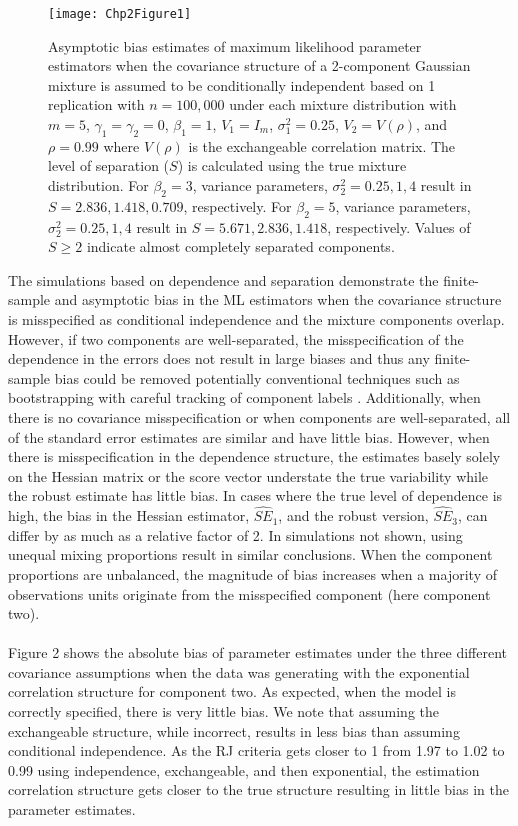 \documentclass[10pt]{article}
\begin{document}
\begin{figure}
\begin{center}
\texttt{[image: Chp2Figure1]}
\end{center}
\caption{Asymptotic bias estimates of maximum likelihood parameter estimators when the covariance structure of a 2-component Gaussian mixture is assumed to be conditionally independent based on 1 replication with $n=100,000$ under each mixture distribution with $m=5$, $\gamma_1=\gamma_2=0$, $\beta_{1}=1$, $V_1=I_{m}$, $\sigma_1^{2}=0.25$,  $V_2=V(\rho)$, and $\rho=0.99$ where $V(\rho)$ is the exchangeable correlation matrix. The level of separation ($S$) is calculated using the true mixture distribution. For $\beta_{2} = 3$, variance parameters, $\sigma_{2}^{2}=0.25,1,4$ result in $S=2.836,1.418, 0.709$, respectively. For $\beta_{2} = 5$, variance parameters, $\sigma_{2}^{2}=0.25,1,4$ result in $S=5.671,2.836,1.418$, respectively. Values of $S\geq 2$ indicate almost completely separated components.}
\label{fig:1}
\end{figure}
The simulations based on dependence and separation demonstrate the finite-sample and asymptotic bias in the ML estimators when the covariance structure is misspecified as conditional independence and the mixture components overlap. However, if two components are well-separated, the misspecification of the dependence in the errors does not result in large biases and thus any finite-sample bias could be removed potentially conventional techniques such as bootstrapping with careful tracking of component labels \cite{grun2004}. Additionally, when there is no covariance misspecification or when components are well-separated, all of the standard error estimates are similar and have little bias. However, when there is misspecification in the dependence structure, the estimates basely solely on the Hessian matrix or the score vector understate the true variability while the robust estimate has little bias. In cases where the true level of dependence is high, the bias in the Hessian estimator, $\widehat{SE}_{1}$, and the robust version, $\widehat{SE}_{3}$, can differ by as much as a relative factor of 2. In simulations not shown, using unequal mixing proportions result in similar conclusions. When the component proportions are unbalanced, the magnitude of bias increases when a majority of observations units originate from the misspecified component (here component two). \\\\
Figure 2 shows the absolute bias of parameter estimates under the three different covariance assumptions when the data was generating with the exponential correlation structure for component two. As expected, when the model is correctly specified, there is very little bias. We note that assuming the exchangeable structure, while incorrect, results in less bias than assuming conditional independence. As the RJ criteria gets closer to 1 from 1.97 to 1.02 to 0.99 using independence, exchangeable, and then exponential, the estimation correlation structure gets closer to the true structure resulting in little bias in the parameter estimates.
\end{document}
